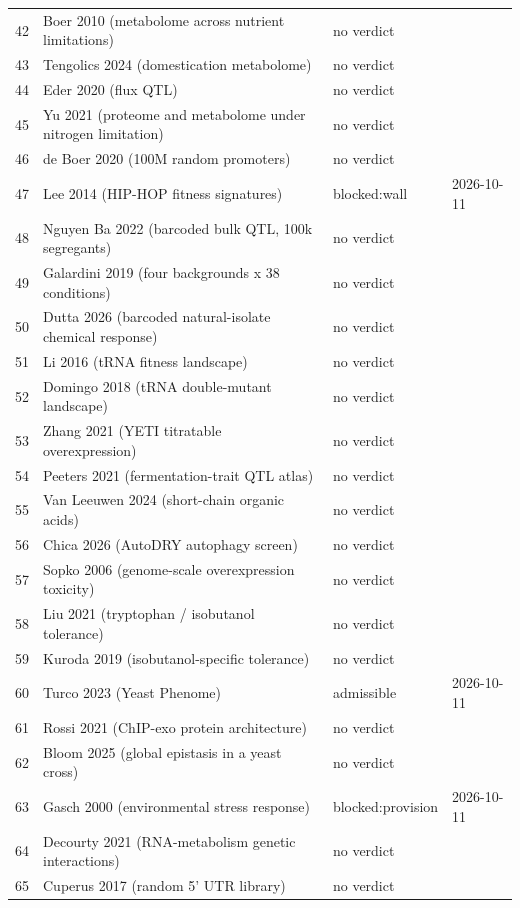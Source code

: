 \begin{longtable}{@{}r L{88mm} L{40mm} L{24mm}@{}}
42 & Boer 2010 (metabolome across nutrient limitations) & no verdict &  \\
43 & Tengolics 2024 (domestication metabolome) & no verdict &  \\
44 & Eder 2020 (flux QTL) & no verdict &  \\
45 & Yu 2021 (proteome and metabolome under nitrogen limitation) & no verdict &  \\
46 & de Boer 2020 (100M random promoters) & no verdict &  \\
47 & Lee 2014 (HIP-HOP fitness signatures) & blocked:wall & 2026-10-11 \\
48 & Nguyen Ba 2022 (barcoded bulk QTL, 100k segregants) & no verdict &  \\
49 & Galardini 2019 (four backgrounds x 38 conditions) & no verdict &  \\
50 & Dutta 2026 (barcoded natural-isolate chemical response) & no verdict &  \\
51 & Li 2016 (tRNA fitness landscape) & no verdict &  \\
52 & Domingo 2018 (tRNA double-mutant landscape) & no verdict &  \\
53 & Zhang 2021 (YETI titratable overexpression) & no verdict &  \\
54 & Peeters 2021 (fermentation-trait QTL atlas) & no verdict &  \\
55 & Van Leeuwen 2024 (short-chain organic acids) & no verdict &  \\
56 & Chica 2026 (AutoDRY autophagy screen) & no verdict &  \\
57 & Sopko 2006 (genome-scale overexpression toxicity) & no verdict &  \\
58 & Liu 2021 (tryptophan / isobutanol tolerance) & no verdict &  \\
59 & Kuroda 2019 (isobutanol-specific tolerance) & no verdict &  \\
60 & Turco 2023 (Yeast Phenome) & admissible & 2026-10-11 \\
61 & Rossi 2021 (ChIP-exo protein architecture) & no verdict &  \\
62 & Bloom 2025 (global epistasis in a yeast cross) & no verdict &  \\
63 & Gasch 2000 (environmental stress response) & blocked:provision & 2026-10-11 \\
64 & Decourty 2021 (RNA-metabolism genetic interactions) & no verdict &  \\
65 & Cuperus 2017 (random 5' UTR library) & no verdict &  \\

\end{longtable}
